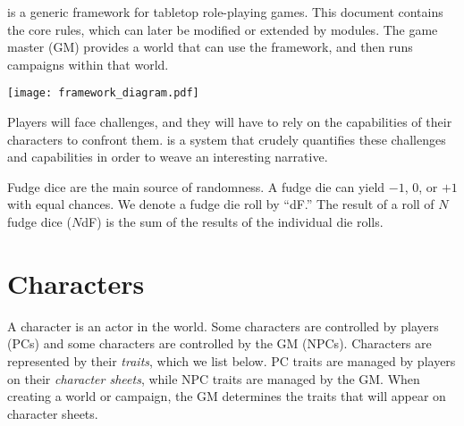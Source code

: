 \peupfudge{} is a generic framework for tabletop role-playing games.
This document contains the core rules, which can later be modified or extended by modules.
The game master (GM) provides a world that can use the \peupfudge{} framework,
and then runs campaigns within that world. 

\begin{center}
\texttt{[image: framework\_diagram.pdf]}
\end{center}

Players will face challenges, and they will have to rely on the capabilities of their characters to confront them.
\peupfudge{} is a system that crudely quantifies these challenges and capabilities in order to weave an interesting narrative.

Fudge dice are the main source of randomness. A fudge die can yield $-1$, $0$, or $+1$ with equal chances.
We denote a fudge die roll by ``dF.'' The result of a roll of $N$ fudge dice ($N$dF) is the sum of the results of the individual die rolls.

\section{Characters}
A character is an actor in the world.
Some characters are controlled by players (PCs) and some characters are controlled by the GM (NPCs).
Characters are represented by their \emph{traits}, which we list below.
PC traits are managed by players on their \emph{character sheets}, while NPC traits are managed by the GM.
When creating a world or campaign, the GM determines the traits that will appear on character sheets.

